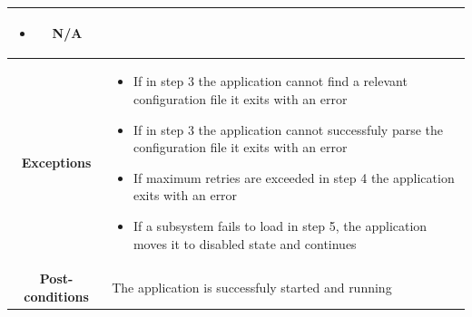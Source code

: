 \documentclass[12pt,a4paper,table]{article}
\begin{document}
\begin{longtable}{ |c|p{11.8cm}| }
{\begin{itemize}
                        \item N/A
                    \end{itemize}
                }\\ \hline
                \cellcolor[gray]{0.9} \textbf{Exceptions} &
                    \begin{itemize}
                        \item If in step 3 the application cannot find a relevant configuration file it exits with an error
                        \item If in step 3 the application cannot successfuly parse the configuration file it exits with an error
                        \item If maximum retries are exceeded in step 4 the application exits with an error
                        \item If a subsystem fails to load in step 5, the application moves it to disabled state and continues
                    \end{itemize}\\ \hline
                \cellcolor[gray]{0.9} \textbf{Post-conditions} & The application is successfuly started and running\\ \hline
            \end{longtable}
\end{document}
